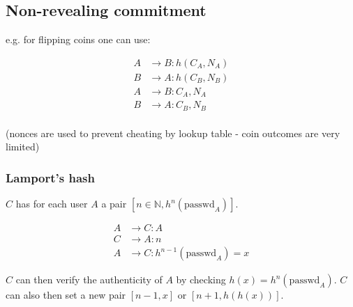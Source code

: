 \documentclass{article}
\begin{document}
\subsection{Non-revealing commitment}

e.g. for flipping coins one can use:

\begin{align*}
  A & \longrightarrow B : h(C_A, N_A) \\
  B & \longrightarrow A : h(C_B,N_B)  \\
  A & \longrightarrow B : C_A, N_A    \\
  B & \longrightarrow A : C_B, N_B    \\
\end{align*}

(nonces are used to prevent cheating by lookup table - coin outcomes are very
limited)

\subsubsection{Lamport's hash}

$C$ has for each user $A$ a pair $[n \in \mathbb{N}, h^n(\text{passwd}_A)]$.

\begin{align*}
  A & \rightarrow C : A \\
  C & \rightarrow A : n \\
  A &\rightarrow C  : h^{n-1}(\text{passwd}_A) = x
\end{align*}

$C$ can then verify the authenticity of $A$ by checking $h(x)
= h^n(\text{passwd}_A)$. $C$ can also then set a new pair $[n-1,x]$ or
$[n+1, h(h(x))]$.
\end{document}

